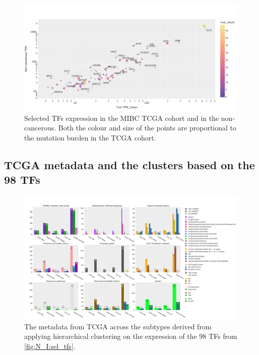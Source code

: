 \begin{figure}[H]   
\centering
\includegraphics[width=1.0\textwidth,height=1.0\textheight,keepaspectratio]{Sections/Network_I/Resources/selective_pruning/sel_tfs_mean_tum_healthy.png}
  \caption{Selected TFs expression in the MIBC TCGA cohort and in the non-cancerous. Both the colour and size of the points are proportional to the mutation burden in the TCGA cohort.}
\label{fig:ap:sel_tfs_mean}
\end{figure}

\subsection{TCGA metadata and the clusters based on the 98 TFs} 

\label{s:ap:sel_prun_tcga_meta}

\begin{figure}[!htb]   
\centering
\includegraphics[width=1.0\textwidth,height=1.0\textheight,keepaspectratio]{Sections/Network_I/Resources/selective_pruning/sel_tfs_tcga_meta.png}
  \caption{The metadata from TCGA \cite{Robertson2017-mg} across the subtypes derived from applying hierarchical clustering on the expression of the 98 TFs from \cref{fig:N_I:sel_tfs}. }
\label{fig:ap:sel_tfs_tcga_metadata}
\end{figure}


